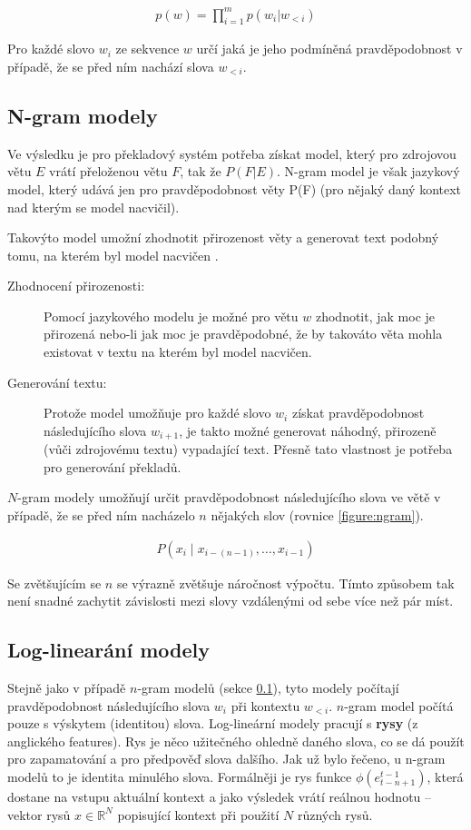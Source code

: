 \begin{align}\label{figure:probdistr}
  p(w) = \prod_{i=1}^{m} p(w_i|w_{<i})
\end{align}

Pro každé slovo $w_i$ ze sekvence $w$ určí jaká je jeho podmíněná pravděpodobnost v případě, že se před ním nachází slova $w_{<i}$.

\subsection{N-gram modely}\label{subsection:ngram}
Ve výsledku je pro překladový systém potřeba získat model, který pro zdrojovou větu $E$ vrátí přeloženou větu $F$, tak že $P(F|E)$. N-gram model je však jazykový model, který udává jen pro pravděpodobnost věty P(F) (pro nějaký daný kontext nad kterým se model nacvičil). 

Takovýto model umožní zhodnotit přirozenost věty a generovat text podobný tomu, na kterém byl model nacvičen \cite{nmtTutorial}.

\begin{description}
  \item[Zhodnocení přirozenosti:] Pomocí jazykového modelu je možné pro větu $w$ zhodnotit, jak moc je přirozená nebo-li jak moc je pravděpodobné, že by takováto věta mohla existovat v textu na kterém byl model nacvičen.
  \item[Generování textu:] Protože model umožňuje pro každé slovo $w_i$ získat pravděpodobnost následujícího slova $w_{i+1}$, je takto možné generovat náhodný, přirozeně (vůči zdrojovému textu) vypadající text. Přesně tato vlastnost je potřeba pro generování překladů.
\end{description}

$N$-gram modely umožňují určit pravděpodobnost následujícího slova ve větě v případě, že se před ním nacházelo $n$ nějakých slov (rovnice \ref{figure:ngram}).

\begin{align}\label{figure:ngram}
    P(x_{i}\mid x_{{i-(n-1)}},\dots ,x_{{i-1}})
\end{align}

Se zvětšujícím se $n$ se výrazně zvětšuje náročnost výpočtu. Tímto způsobem tak není snadné zachytit závislosti mezi slovy vzdálenými od sebe více než pár míst.

\subsection{Log-linearání modely} \label{subsection:loglinear}
Stejně jako v případě $n$-gram modelů (sekce \ref{subsection:ngram}), tyto modely počítají pravděpodobnost následujícího slova $w_i$ při kontextu $w_{<i}$. $n$-gram model počítá pouze s výskytem (identitou) slova. Log-lineární modely pracují s \textbf{rysy} (z anglického features). Rys je něco užitečného ohledně daného slova, co se dá použít pro zapamatování a pro předpověď slova dalšího. Jak už bylo řečeno, u n-gram modelů to je identita minulého slova. Formálněji je rys funkce $\phi(e^{t-1}_{t-n+1})$, která dostane na vstupu aktuální kontext a jako výsledek vrátí reálnou hodnotu -- vektor rysů $x \in \mathbb{R}^N$ popisující kontext při použití $N$ různých rysů.

